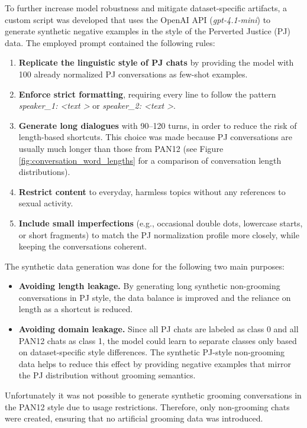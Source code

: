To further increase model robustness and mitigate dataset-specific artifacts, a custom script was developed that uses the OpenAI API (\textit{gpt-4.1-mini}) to generate synthetic negative examples in the style of the Perverted Justice (PJ) data. The employed prompt contained the following rules:
\begin{enumerate}
\item \textbf{Replicate the linguistic style of PJ chats} by providing the model with 100 already normalized PJ conversations as few-shot examples.
\item \textbf{Enforce strict formatting}, requiring every line to follow the pattern \textit{speaker\_1: \textless text \textgreater} or \textit{speaker\_2: \textless text \textgreater}.
\item \textbf{Generate long dialogues} with 90–120 turns, in order to reduce the risk of length-based shortcuts. This choice was made because PJ conversations are usually much longer than those from PAN12 (see Figure \ref{fig:conversation_word_lengths} for a comparison of conversation length distributions).
\item \textbf{Restrict content} to everyday, harmless topics without any references to sexual activity.
\item \textbf{Include small imperfections} (e.g., occasional double dots, lowercase starts, or short fragments) to match the PJ normalization profile more closely, while keeping the conversations coherent.
\end{enumerate}

The synthetic data generation was done for the following two main purposes:

\begin{itemize}
    \item \textbf{Avoiding length leakage.} By generating long synthetic non-grooming conversations in PJ style, the data balance is improved and the reliance on length as a shortcut is reduced.
    \item \textbf{Avoiding domain leakage.} Since all PJ chats are labeled as class 0 and all PAN12 chats as class 1, the model could learn to separate classes only based on dataset-specific style differences. The synthetic PJ-style non-grooming data helps to reduce this effect by providing negative examples that mirror the PJ distribution without grooming semantics.
\end{itemize}

Unfortunately it was not possible to generate synthetic grooming conversations in the PAN12 style due to usage restrictions. Therefore, only non-grooming chats were created, ensuring that no artificial grooming data was introduced.


